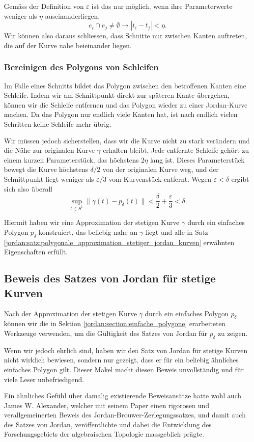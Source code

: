 Gemäss der Definition von $\varepsilon$ ist das nur möglich, wenn ihre Parameterwerte weniger als $\eta$ auseinanderliegen.
\[
  e_i \cap e_j \neq \emptyset \rightarrow |t_i - t_j| < \eta .
\]
Wir können also daraus schliessen, dass Schnitte nur zwischen Kanten auftreten, die auf der Kurve nahe beieinander liegen.

\subsubsection{Bereinigen des Polygons von Schleifen}

Im Falle eines Schnitts bildet das Polygon zwischen den betroffenen Kanten eine Schleife.
Indem wir am Schnittpunkt direkt zur späteren Kante übergehen, können wir die Schleife entfernen und das Polygon wieder zu einer Jordan-Kurve machen.
Da das Polygon nur endlich viele Kanten hat, ist nach endlich vielen Schritten keine Schleife mehr übrig.

Wir müssen jedoch sicherstellen, dass wir die Kurve nicht zu stark verändern und die Nähe zur originalen Kurve $\gamma$ erhalten bleibt.
Jede entfernte Schleife gehört zu einem kurzen Parameterstück, das höchstens $2 \eta$ lang ist.
Dieses Parameterstück bewegt die Kurve höchstens $\delta / 2$ von der originalen Kurve weg, und der Schnittpunkt liegt weniger als $\varepsilon / 3$ vom Kurvenstück entfernt.
Wegen $\varepsilon < \delta$ ergibt sich also überall
\[
    \sup_{t \in S^1} \|\gamma(t) - p_\delta(t)\| < \frac{\delta}{2} + \frac{\varepsilon}{3} < \delta.
\]

Hiermit haben wir eine Approximation der stetigen Kurve $\gamma$ durch ein einfaches Polygon $p_\delta$ konstruiert, das beliebig nahe an $\gamma$ liegt und alle in Satz \ref{jordan:satz:polygonale_approximation_stetiger_jordan_kurven} erwähnten Eigenschaften erfüllt.

\subsection{Beweis des Satzes von Jordan für stetige Kurven}

Nach der Approximation der stetigen Kurve $\gamma$ durch ein einfaches Polygon $p_\delta$ können wir die in Sektion \ref{jordan:section:einfache_polygone} erarbeiteten Werkzeuge verwenden, um die Gültigkeit des Satzes von Jordan für $p_\delta$ zu zeigen.

Wenn wir jedoch ehrlich sind, haben wir den Satz von Jordan für stetige Kurven nicht wirklich bewiesen, sondern nur gezeigt, dass er für ein beliebig ähnliches einfaches Polygon gilt.
Dieser Makel macht diesen Beweis unvollständig und für viele Leser unbefriedigend.

Ein ähnliches Gefühl über damalig existierende Beweisansätze hatte wohl auch James W. Alexander, welcher mit seinem Paper \cite{jordan:Alexander1922} einen rigorosen und verallgemeinerten Beweis des Jordan-Brouwer-Zerlegungssatzes, und damit auch des Satzes von Jordan, veröffentlichte und dabei die Entwicklung des Forschungsgebiets der algebraischen Topologie massgeblich prägte.
%
%
%

